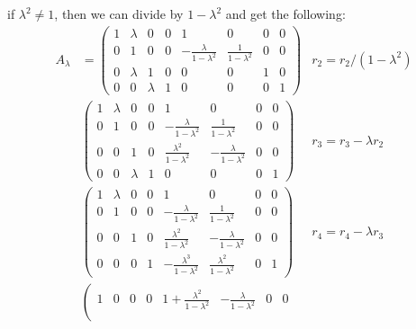 \documentclass{article}
\begin{document}
if $\lambda^2 \neq 1$, then we can divide by $1 - \lambda^2$ and get the following:
\begin{align*}
    A_\lambda &= \left(
    \begin{array}{cccc|cccc}
        1 & \lambda & 0 & 0 & 1 & 0 & 0 & 0 \\
        0 & 1 & 0 & 0 & -\frac{\lambda}{1 - \lambda^2} & \frac{1}{1 - \lambda^2} & 0 & 0 \\
        0 & \lambda & 1 & 0 & 0 & 0 & 1 & 0 \\
        0 & 0 & \lambda & 1 & 0 & 0 & 0 & 1
    \end{array}
\right) & r_2 = r_2 / (1 - \lambda^2)\\
&\left(
    \begin{array}{cccc|cccc}
        1 & \lambda & 0       & 0 & 1                                & 0                             & 0 & 0 \\
        0 & 1       & 0       & 0 & -\frac{\lambda}{1 - \lambda^2}   & \frac{1}{1 - \lambda^2}       & 0 & 0 \\
        0 & 0       & 1       & 0 & \frac{\lambda^2}{1 - \lambda^2} & -\frac{\lambda}{1 - \lambda^2} & 0 & 0 \\
        0 & 0       & \lambda & 1 & 0                                & 0                             & 0 & 1
    \end{array}
    \right) & r_3 = r_3 - \lambda r_2 \\
&\left(
    \begin{array}{cccc|cccc}
        1 & \lambda & 0       & 0                                   & 1                                & 0                             & 0 & 0 \\
        0 & 1       & 0       & 0                                   & -\frac{\lambda}{1 - \lambda^2}   & \frac{1}{1 - \lambda^2}       & 0 & 0 \\
        0 & 0       & 1       & 0                                   & \frac{\lambda^2}{1 - \lambda^2} & -\frac{\lambda}{1 - \lambda^2} & 0 & 0 \\
        0 & 0       & 0 & 1 & -\frac{\lambda^3}{1 - \lambda^2} & \frac{\lambda^2}{1 - \lambda^2}                             & 0 & 1
    \end{array}
    \right) & r_4 = r_4 - \lambda r_3 \\
&\left(
    \begin{array}{cccc|cccc}
        1 & 0 & 0       & 0                                   & 1 + \frac{\lambda^2}{1 - \lambda^2}                               & -\frac{\lambda}{1 - \lambda^2}                             & 0 & 0 \\

\end{array}
\end{align*}
\end{document}
